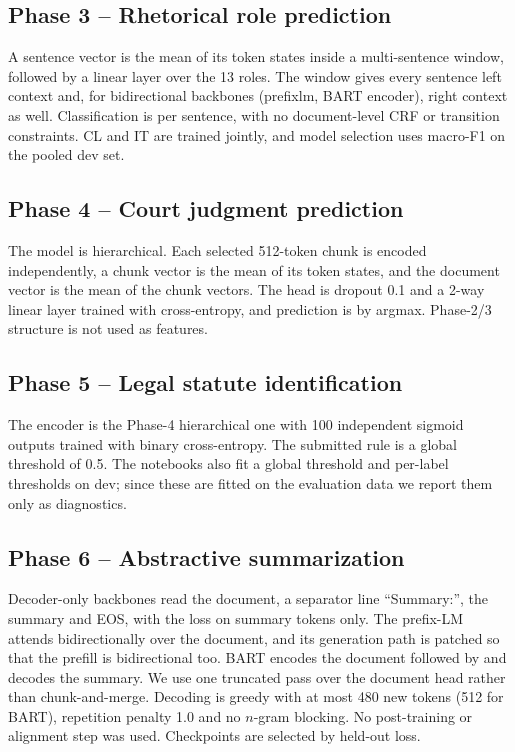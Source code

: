 \documentclass[11pt, oneside]{article}
\newcommand{\tsc}[1]{\texttt{\detokenize{#1}}}
\begin{document}
\subsection{Phase 3 -- Rhetorical role prediction}
A sentence vector is the mean of its token states inside a multi-sentence window, followed by a linear layer over the 13 roles. The window gives every sentence left context and, for bidirectional backbones (prefixlm, BART encoder), right context as well. Classification is per sentence, with no document-level CRF or transition constraints. CL and IT are trained jointly, and model selection uses macro-F1 on the pooled dev set.

\subsection{Phase 4 -- Court judgment prediction}
The model is hierarchical. Each selected 512-token chunk is encoded independently, a chunk vector is the mean of its token states, and the document vector is the mean of the chunk vectors. The head is dropout 0.1 and a 2-way linear layer trained with cross-entropy, and prediction is by argmax. Phase-2/3 structure is not used as features.

\subsection{Phase 5 -- Legal statute identification}
The encoder is the Phase-4 hierarchical one with 100 independent sigmoid outputs trained with binary cross-entropy. The submitted rule is a global threshold of 0.5. The notebooks also fit a global threshold and per-label thresholds on dev; since these are fitted on the evaluation data we report them only as diagnostics.

\subsection{Phase 6 -- Abstractive summarization}
Decoder-only backbones read the document, a separator line ``Summary:'', the summary and EOS, with the loss on summary tokens only. The prefix-LM attends bidirectionally over the document, and its generation path is patched so that the prefill is bidirectional too. BART encodes the document followed by \tsc{<mask>} and decodes the summary. We use one truncated pass over the document head rather than chunk-and-merge. Decoding is greedy with at most 480 new tokens (512 for BART), repetition penalty 1.0 and no $n$-gram blocking. No post-training or alignment step was used. Checkpoints are selected by held-out loss.
\end{document}
